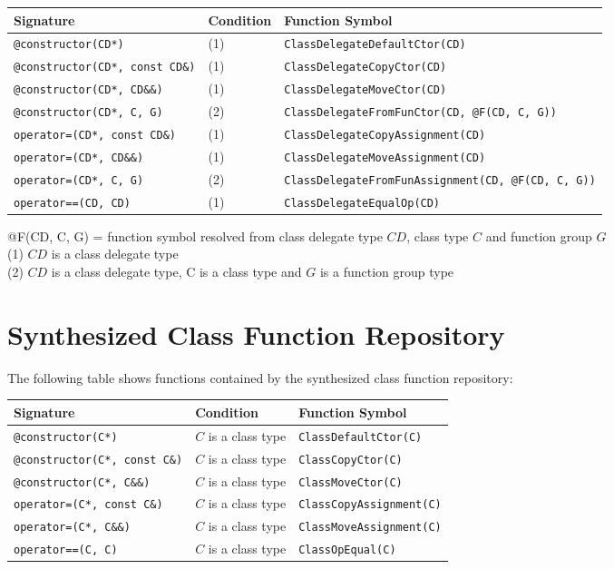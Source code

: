 \documentclass[a4paper,oneside,11pt]{book}
\theoremstyle{definition}
\begin{document}
\begin{flushleft}
\begin{supertabular}{lll}
\textbf{Signature}& \textbf{Condition}& \textbf{Function Symbol}\\
\hline
\verb|@constructor(CD*)|& (1)& \verb|ClassDelegateDefaultCtor(CD)|\\
\verb|@constructor(CD*, const CD&)|& (1)& \verb|ClassDelegateCopyCtor(CD)|\\
\verb|@constructor(CD*, CD&&)|& (1)& \verb|ClassDelegateMoveCtor(CD)|\\
\verb|@constructor(CD*, C, G)|& (2)& \verb|ClassDelegateFromFunCtor(CD, @F(CD, C, G))|\\
\verb|operator=(CD*, const CD&)|& (1)& \verb|ClassDelegateCopyAssignment(CD)|\\
\verb|operator=(CD*, CD&&)|& (1)& \verb|ClassDelegateMoveAssignment(CD)|\\
\verb|operator=(CD*, C, G)|& (2)& \verb|ClassDelegateFromFunAssignment(CD, @F(CD, C, G))|\\
\verb|operator==(CD, CD)|& (1)& \verb|ClassDelegateEqualOp(CD)|\\
\hline
\end{supertabular}
\end{flushleft}

\begin{flushleft}
@F(CD, C, G) = function symbol resolved from class delegate type $CD$, class type $C$ and function group $G$\\
(1) $CD$ is a class delegate type\\
(2) $CD$ is a class delegate type, C is a class type and $G$ is a function group type\\
\end{flushleft}

\section{Synthesized Class Function Repository}

The following table shows functions contained by the synthesized class function repository:

\begin{flushleft}
\begin{supertabular}{lll}
\textbf{Signature}& \textbf{Condition}& \textbf{Function Symbol}\\
\hline
\verb|@constructor(C*)|& $C$ is a class type& \verb|ClassDefaultCtor(C)|\\
\verb|@constructor(C*, const C&)|& $C$ is a class type& \verb|ClassCopyCtor(C)|\\
\verb|@constructor(C*, C&&)|& $C$ is a class type& \verb|ClassMoveCtor(C)|\\
\verb|operator=(C*, const C&)|& $C$ is a class type& \verb|ClassCopyAssignment(C)|\\
\verb|operator=(C*, C&&)|& $C$ is a class type& \verb|ClassMoveAssignment(C)|\\
\verb|operator==(C, C)|& $C$ is a class type& \verb|ClassOpEqual(C)|\\
\hline
\end{supertabular}
\end{flushleft}
\end{document}
